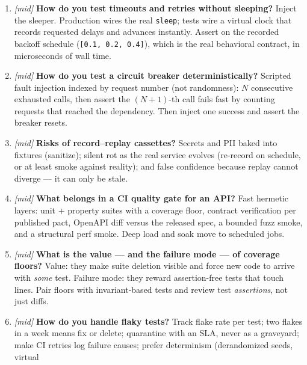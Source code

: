 \begin{enumerate}[label=\textbf{Q\arabic*.}, leftmargin=1.7cm]
        Automatic minimization of a failing input while the failure still
        reproduces. It converts ``500 on this 4{,}000-key blob'' into
        ``500 when \texttt{price\_cents} is 666'' --- the difference
        between noise and a bug report.
  \item \emph{[mid]} \textbf{How do you test timeouts and retries without
        sleeping?} Inject the sleeper. Production wires the real
        \texttt{sleep}; tests wire a virtual clock that records requested
        delays and advances instantly. Assert on the recorded backoff
        schedule (\texttt{[0.1, 0.2, 0.4]}), which is the real behavioral
        contract, in microseconds of wall time.
  \item \emph{[mid]} \textbf{How do you test a circuit breaker
        deterministically?} Scripted fault injection indexed by request
        number (not randomness): $N$ consecutive exhausted calls, then
        assert the $(N{+}1)$-th call fails fast by counting requests that
        reached the dependency. Then inject one success and assert the
        breaker resets.
  \item \emph{[mid]} \textbf{Risks of record--replay cassettes?} Secrets
        and PII baked into fixtures (sanitize); silent rot as the real
        service evolves (re-record on schedule, or at least smoke against
        reality); and false confidence because replay cannot diverge ---
        it can only be stale.
  \item \emph{[mid]} \textbf{What belongs in a CI quality gate for an
        API?} Fast hermetic layers: unit + property suites with a coverage
        floor, contract verification per published pact, OpenAPI diff
        versus the released spec, a bounded fuzz smoke, and a structural
        perf smoke. Deep load and soak move to scheduled jobs.
  \item \emph{[mid]} \textbf{What is the value --- and the failure mode ---
        of coverage floors?} Value: they make suite deletion visible and
        force new code to arrive with \emph{some} test. Failure mode: they
        reward assertion-free tests that touch lines. Pair floors with
        invariant-based tests and review test \emph{assertions}, not just
        diffs.
  \item \emph{[mid]} \textbf{How do you handle flaky tests?} Track flake
        rate per test; two flakes in a week means fix or delete;
        quarantine with an SLA, never as a graveyard; make CI retries log
        failure causes; prefer determinism (derandomized seeds, virtual

\end{enumerate}
